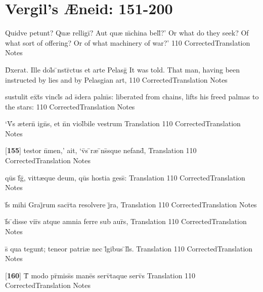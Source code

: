 \section{Vergil's {\AE}neid: 151-200} %

\latline
  {Quidve petunt?  Qu{\ae} relligi\={}?  Aut qu{\ae} m\={}china bell\={\macron {\i}}?'}
  { Or what do they seek?  Of what sort of offering?  Or of what machinery of war?' }
  {110}
  { CorrectedTranslation }
  { Notes }


\latline
  {D\={\macron {\i}}xerat.  Ille dol\={\macron {\i}}s \={\macron {\i}}nstr\={}ctus et arte Pelasg\={}}
  { It was told.  That man, having been instructed by lies and by Pelasgian art,  }
  {110}
  { CorrectedTranslation }
  { Notes }


\latline
  {sustulit ex\={}t\={}s vincl\={\macron {\i}}s ad s\={\macron {\i}}dera palm\={}s:}
  { liberated from chains, lifts his freed palmas to the stars: }
  {110}
  { CorrectedTranslation }
  { Notes }


\latline
  {`V\={}s {\ae}tern\={\macron {\i}} ign\={}s, et n\={}n viol\={}bile vestrum}
  { Translation }
  {110}
  { CorrectedTranslation }
  { Notes }


\latline
  {[\textbf{155}] testor n\={}men,' ait, `v\={}s \={}r{\ae} \={}ns\={}sque nefand\={\macron {\i}},}
  { Translation }
  {110}
  { CorrectedTranslation }
  { Notes }


\latline
  {qu\={}s f\={}g\={\macron {\i}}, vitt{\ae}que deum, qu\={}s hostia gess\={\macron {\i}}:}
  { Translation }
  {110}
  { CorrectedTranslation }
  { Notes }


\latline
  {f\={}s mihi Graj\={}rum sacr\={}ta resolvere j\={}ra,}
  { Translation }
  {110}
  { CorrectedTranslation }
  { Notes }


\latline
  {f\={}s \={}disse vir\={}s atque amnia ferre sub aur\={}s,}
  { Translation }
  {110}
  { CorrectedTranslation }
  { Notes }


\latline
  {s\={\macron {\i}} qua tegunt; teneor patri{\ae} nec l\={}gibus \={}ll\={\macron {\i}}s.  }
  { Translation }
  {110}
  { CorrectedTranslation }
  { Notes }


\latline
  {[\textbf{160}] T\={} modo pr\={}miss\={\macron {\i}}s mane\={}s serv\={}taque serv\={}s}
  { Translation }
  {110}
  { CorrectedTranslation }
  { Notes }


